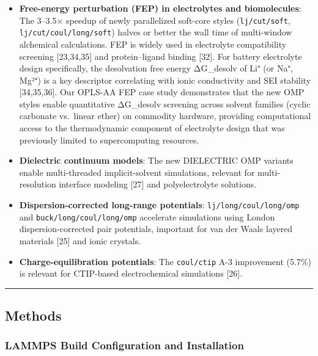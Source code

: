 \documentclass[
  11pt,
]{article}
\begin{document}
\begin{itemize}
\item
  \textbf{Free-energy perturbation (FEP) in electrolytes and
  biomolecules}: The 3--3.5× speedup of newly parallelized soft-core
  styles (\texttt{lj/cut/soft}, \texttt{lj/cut/coul/long/soft}) halves
  or better the wall time of multi-window alchemical calculations. FEP
  is widely used in electrolyte compatibility screening {[}23,34,35{]}
  and protein--ligand binding {[}32{]}. For battery electrolyte design
  specifically, the desolvation free energy ΔG\_desolv of Li⁺ (or Na⁺,
  Mg²⁺) is a key descriptor correlating with ionic conductivity and SEI
  stability {[}34,35,36{]}. Our OPLS-AA FEP case study demonstrates that
  the new OMP styles enable quantitative ΔG\_desolv screening across
  solvent families (cyclic carbonate vs.~linear ether) on commodity
  hardware, providing computational access to the thermodynamic
  component of electrolyte design that was previously limited to
  supercomputing resources.
\item
  \textbf{Dielectric continuum models}: The new DIELECTRIC OMP variants
  enable multi-threaded implicit-solvent simulations, relevant for
  multi-resolution interface modeling {[}27{]} and polyelectrolyte
  solutions.
\item
  \textbf{Dispersion-corrected long-range potentials}:
  \texttt{lj/long/coul/long/omp} and \texttt{buck/long/coul/long/omp}
  accelerate simulations using London dispersion-corrected pair
  potentials, important for van der Waals layered materials {[}25{]} and
  ionic crystals.
\item
  \textbf{Charge-equilibration potentials}: The \texttt{coul/ctip} A-3
  improvement (5.7\%) is relevant for CTIP-based electrochemical
  simulations {[}26{]}.
\end{itemize}

\begin{center}\rule{0.5\linewidth}{0.5pt}\end{center}

\subsection{Methods}\label{methods}

\subsubsection{LAMMPS Build Configuration and
Installation}\label{lammps-build-configuration-and-installation}
\end{document}
